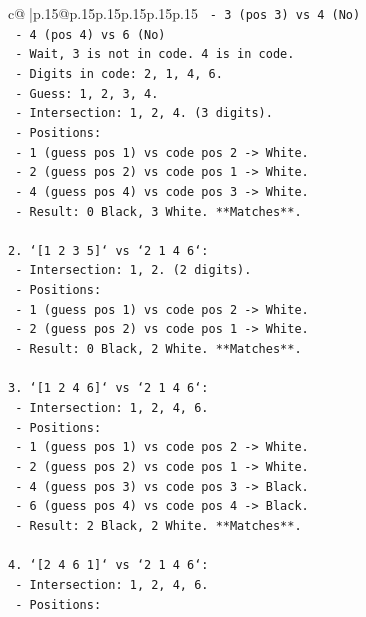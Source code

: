 \documentclass{article}
\begin{document}
{\begin{supertabular}{c@{$\;$}|p{.15\linewidth}@{}p{.15\linewidth}p{.15\linewidth}p{.15\linewidth}p{.15\linewidth}p{.15\linewidth}}
{{{\texttt{   {-} 3 (pos 3) vs 4 (No)} \\
\texttt{   {-} 4 (pos 4) vs 6 (No)} \\
\texttt{   {-} Wait, 3 is not in code. 4 is in code.} \\
\texttt{   {-} Digits in code: 2, 1, 4, 6.} \\
\texttt{   {-} Guess: 1, 2, 3, 4.} \\
\texttt{   {-} Intersection: 1, 2, 4. (3 digits).} \\
\texttt{   {-} Positions:} \\
\texttt{     {-} 1 (guess pos 1) vs code pos 2 {-}> White.} \\
\texttt{     {-} 2 (guess pos 2) vs code pos 1 {-}> White.} \\
\texttt{     {-} 4 (guess pos 4) vs code pos 3 {-}> White.} \\
\texttt{   {-} Result: 0 Black, 3 White. **Matches**.} \\
\\ 
\texttt{2. `{[}1 2 3 5{]}` vs `2 1 4 6`:} \\
\texttt{   {-} Intersection: 1, 2. (2 digits).} \\
\texttt{   {-} Positions:} \\
\texttt{     {-} 1 (guess pos 1) vs code pos 2 {-}> White.} \\
\texttt{     {-} 2 (guess pos 2) vs code pos 1 {-}> White.} \\
\texttt{   {-} Result: 0 Black, 2 White. **Matches**.} \\
\\ 
\texttt{3. `{[}1 2 4 6{]}` vs `2 1 4 6`:} \\
\texttt{   {-} Intersection: 1, 2, 4, 6.} \\
\texttt{   {-} Positions:} \\
\texttt{     {-} 1 (guess pos 1) vs code pos 2 {-}> White.} \\
\texttt{     {-} 2 (guess pos 2) vs code pos 1 {-}> White.} \\
\texttt{     {-} 4 (guess pos 3) vs code pos 3 {-}> Black.} \\
\texttt{     {-} 6 (guess pos 4) vs code pos 4 {-}> Black.} \\
\texttt{   {-} Result: 2 Black, 2 White. **Matches**.} \\
\\ 
\texttt{4. `{[}2 4 6 1{]}` vs `2 1 4 6`:} \\
\texttt{   {-} Intersection: 1, 2, 4, 6.} \\
\texttt{   {-} Positions:} \\
}}}
\end{supertabular}}
\end{document}
